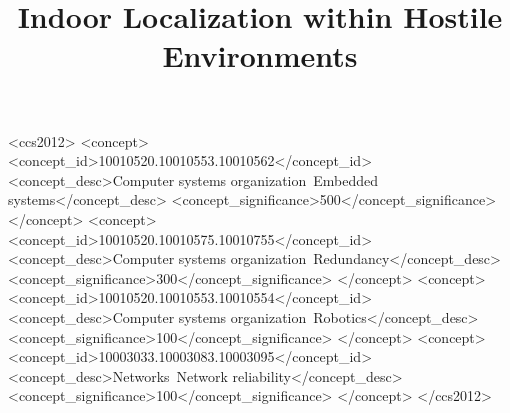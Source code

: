 \documentclass[sigconf]{acmart}
\begin{document}
\title{Indoor Localization within Hostile Environments}









\begin{abstract}




\end{abstract}

%
%
\begin{CCSXML}
<ccs2012>
 <concept>
  <concept_id>10010520.10010553.10010562</concept_id>
  <concept_desc>Computer systems organization~Embedded systems</concept_desc>
  <concept_significance>500</concept_significance>
 </concept>
 <concept>
  <concept_id>10010520.10010575.10010755</concept_id>
  <concept_desc>Computer systems organization~Redundancy</concept_desc>
  <concept_significance>300</concept_significance>
 </concept>
 <concept>
  <concept_id>10010520.10010553.10010554</concept_id>
  <concept_desc>Computer systems organization~Robotics</concept_desc>
  <concept_significance>100</concept_significance>
 </concept>
 <concept>
  <concept_id>10003033.10003083.10003095</concept_id>
  <concept_desc>Networks~Network reliability</concept_desc>
  <concept_significance>100</concept_significance>
 </concept>
</ccs2012>
\end{CCSXML}

\end{document}

